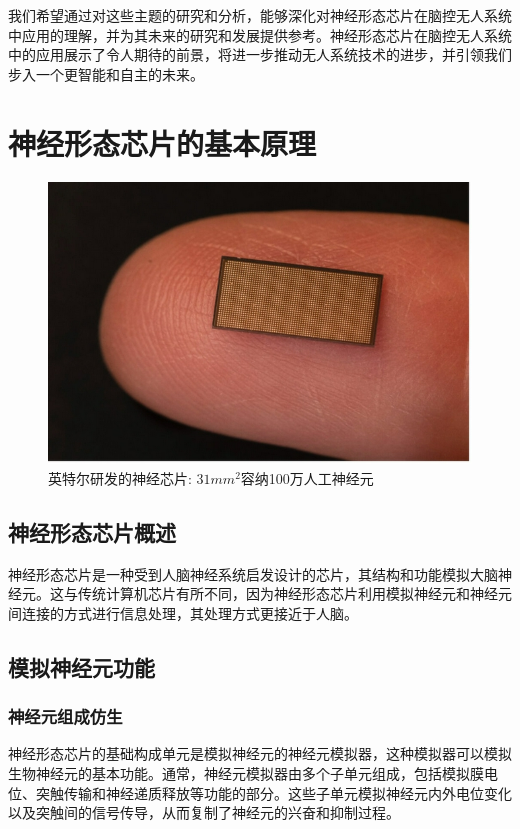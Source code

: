 \documentclass{thuemp}
\begin{document}
我们希望通过对这些主题的研究和分析，能够深化对神经形态芯片在脑控无人系统中应用的理解，并为其未来的研究和发展提供参考。神经形态芯片在脑控无人系统中的应用展示了令人期待的前景，将进一步推动无人系统技术的进步，并引领我们步入一个更智能和自主的未来。

\section{神经形态芯片的基本原理}

\begin{figure}[h]
	\centering
    \includegraphics[width=0.8\linewidth]{./img/yte_sjxp.jpg}
    \caption{英特尔研发的神经芯片: $31mm^2$容纳100万人工神经元} 
\end{figure}

\subsection{神经形态芯片概述}

神经形态芯片是一种受到人脑神经系统启发设计的芯片，其结构和功能模拟大脑神经元。这与传统计算机芯片有所不同，因为神经形态芯片利用模拟神经元和神经元间连接的方式进行信息处理，其处理方式更接近于人脑。

\subsection{模拟神经元功能}

\subsubsection{神经元组成仿生}
神经形态芯片的基础构成单元是模拟神经元的神经元模拟器，这种模拟器可以模拟生物神经元的基本功能。通常，神经元模拟器由多个子单元组成，包括模拟膜电位、突触传输和神经递质释放等功能的部分。这些子单元模拟神经元内外电位变化以及突触间的信号传导，从而复制了神经元的兴奋和抑制过程。
\end{document}

